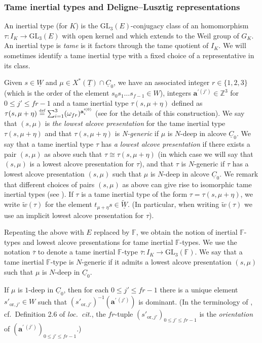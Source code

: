 \documentclass[oneside,a4paper,english, 11pt]{amsart}
\theoremstyle{plain}
\theoremstyle{plain}
\theoremstyle{plain}
\theoremstyle{plain}
\theoremstyle{plain}
\theoremstyle{plain}
\theoremstyle{definition}
\theoremstyle{definition}
\theoremstyle{definition}
\theoremstyle{remark}
\numberwithin{equation}{section}
\newcommand{\Z}{\mathbb{Z}}
\newcommand{\F}{\mathbb{F}}
\newcommand{\GL}{\mathrm{GL}}
\newcommand{\un}[1]{\underline{#1}}
\renewcommand{\bf}[1]{\mathbf{#1}}
\newcommand{\tld}[1]{\widetilde{#1}}
\newcommand{\taubar}{\overline{\tau}}
\newcommand{\orient}{\mathrm{or}}
\newcommand{\defeq}{\stackrel{\textrm{\tiny{def}}}{=}}
\newcommand{\ra}{\rightarrow}
\begin{document}
\subsubsection{Tame inertial types and Deligne--Lusztig representations}
\label{subsub:TIT:DL}
An inertial type (for $K$) is the $\GL_3(E)$-conjugacy class of an homomorphism  $\tau:I_{K}\ra\GL_3(E)$ with open kernel and which extends to the Weil group of $G_K$.
An inertial type is \emph{tame} is it factors through the tame quotient of $I_{K}$. 
%
We will sometimes identify a tame inertial type with a fixed choice of a representative in its class.
%
%

Given $s\in \un{W} $ and $\mu\in X^*(\un{T})\cap \un{C}_0$, we have an associated integer $r\in \{1,2,3\}$ (which is the order of the element $s_0s_1\dots s_{f-1}\in W$), integers $\bf{a}^{\prime(j')}\in \Z^3$ for $0\leq j'\leq fr-1$ and a tame inertial type $\tau(s,\mu+\eta)$ defined as $\tau(s,\mu+\eta)\defeq \sum_{i=1}^3(\omega_{fr})^{\mathbf{a}_i^{\prime(0)}}$ (see \cite[Example 2.4.1, equations (5.2), (5.1)]{MLM} for the details of this construction).
We say that $(s,\mu)$ is \emph{the lowest alcove presentation} for the tame inertial type $\tau(s,\mu+\eta)$ and that $\tau(s,\mu+\eta)$ is \emph{N-generic} if $\mu$ is $N$-deep in alcove $\un{C}_0$.
We say that a tame inertial type $\tau$ has \emph{a lowest alcove presentation} if there exists a pair $(s,\mu)$ as above such that $\tau\cong \tau(s,\mu+\eta)$ (in which case we will say that $(s,\mu)$ is a lowest alcove presentation for $\tau$), and that $\tau$ is $N$-generic if $\tau$ has a lowest alcove presentation $(s,\mu)$ such that $\mu$ is $N$-deep in alcove $\un{C}_0$.
We remark that different choices of pairs $(s,\mu)$ as above can give rise to isomorphic tame inertial types (see \cite[Proposition 2.2.15]{LLL}).  If $\tau$ is a tame inertial type of the form $\tau=\tau(s,\mu+\eta)$, we write $\tld{w}(\tau)$ for the element $t_{\mu+\eta}s\in\tld{\un{W}}$. (In particular, when writing $\tld{w}(\tau)$ we use an implicit lowest alcove presentation for $\tau$).

%
Repeating the above with $E$ replaced by $\F$, we obtain the notion of inertial $\F$-types and lowest alcove presentations for tame inertial $\F$-types. 
We use the notation $\taubar$ to denote a tame inertial $\F$-type $\taubar:I_{K}\ra\GL_3(\F)$. %
We say that a tame inertial $\F$-type is $N$-generic if it admits a lowest alcove presentation $(s,\mu)$ such that $\mu$ is $N$-deep in $\un{C}_0$.
%

If $\mu$ is $1$-deep in $\un{C}_0$, then for each $0\leq j'\leq fr-1$ there is a unique element $s'_{\orient,j'}\in W$ such that $  (s'_{\orient,j'})^{-1}(\bf{a}^{\prime\,(j')})$ is dominant.
(In the terminology of \cite{LLLM}, cf.~Definition 2.6 of \emph{loc.~cit.}, the $fr$-tuple $(s'_{\orient,j'})_{0\leq j'\leq fr-1}$ is the \emph{orientation} of $(\bf{a}^{\prime\,(j')})_{0\leq j'\leq fr-1}$.)
\end{document}
